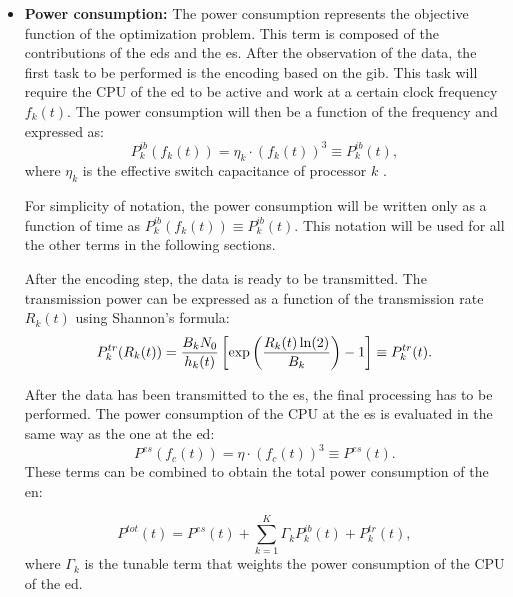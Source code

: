 \begin{itemize}[label={}] 
    \item {\textbf{Power consumption:}} The power consumption represents the objective function of the optimization problem. This term is composed of the contributions of the \glspl{ed} and the \gls{es}. After the observation of the data, the first task to be performed is the encoding based on the \gls{gib}. This task will require the CPU of the \gls{ed} to be active and work at a certain clock frequency $f_k(t)$. The power consumption will then be a function of the frequency and expressed as: \begin{equation} P_k^{ib}(f_k(t)) = \eta_k \cdot (f_k(t))^3 \equiv P_k^{ib}(t), \end{equation} where $\eta_k$ is the effective switch capacitance of processor $k$ \cite{Burd1996EffSwithc}.

    For simplicity of notation, the power consumption will be written only as a function of time as $P_k^{ib}(f_k(t)) \equiv P_k^{ib}(t)$. This notation will be used for all the other terms in the following sections.

    After the encoding step, the data is ready to be transmitted. The transmission power can be expressed as a function of the transmission rate $R_k(t)$ using Shannon's formula:
    \begin{equation}
        P_k^{tr}(R_k(t)) =  \frac{B_k N_0}{h_k(t)} \left[  {\rm exp} \left(\frac{R_k(t) \ln(2)}{B_k} \right)   -1 \right] \equiv P_k^{tr}(t).
    \end{equation}

    After the data has been transmitted to the \gls{es}, the final processing has to be performed. The power consumption of the CPU at the \gls{es} is evaluated in the same way as the one at the \gls{ed}:
    \begin{equation}
        P^{es}(f_c(t)) = \eta \cdot (f_c(t))^3 \equiv P^{es}(t).
    \end{equation}
    These terms can be combined to obtain the total power consumption of the \gls{en}:

    \begin{equation}
        P^{tot}(t) = P^{es}(t) + \sum_{k=1}^K \Gamma_k P_k^{ib}(t) + P_k^{tr}(t),
        \label{eq: EN_ib total power}
    \end{equation}
    where $\Gamma_k$ is the tunable term that weights the power consumption of the CPU of the \gls{ed}.


\end{itemize}
